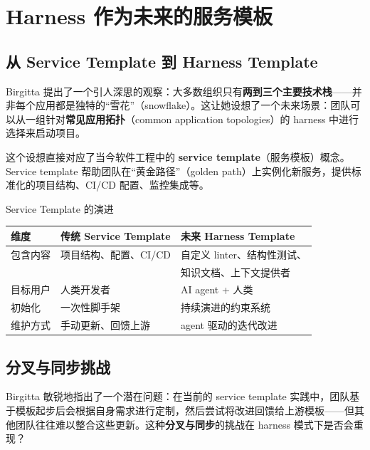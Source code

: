 \documentclass[a4paper]{article}
\begin{document}
\newpage

\section{Harness 作为未来的服务模板}

\subsection{从 Service Template 到 Harness Template}

Birgitta 提出了一个引人深思的观察：大多数组织只有\textbf{两到三个主要技术栈}------并非每个应用都是独特的``雪花''（snowflake）。这让她设想了一个未来场景：团队可以从一组针对\textbf{常见应用拓扑}（common application topologies）的 harness 中进行选择来启动项目。

这个设想直接对应了当今软件工程中的 \textbf{service template}（服务模板）概念。Service template 帮助团队在``黄金路径''（golden path）上实例化新服务，提供标准化的项目结构、CI/CD 配置、监控集成等。

\begin{knowledgebox}{Service Template 的演进}
\begin{table}[H]
\centering
\begin{tabular}{lll}
\toprule
\textbf{维度} & \textbf{传统 Service Template} & \textbf{未来 Harness Template} \\
\midrule
包含内容 & 项目结构、配置、CI/CD & 自定义 linter、结构性测试、 \\
 & & 知识文档、上下文提供者 \\
目标用户 & 人类开发者 & AI agent + 人类 \\
初始化 & 一次性脚手架 & 持续演进的约束系统 \\
维护方式 & 手动更新、回馈上游 & agent 驱动的迭代改进 \\
\bottomrule
\end{tabular}
\end{table}
\end{knowledgebox}

\subsection{分叉与同步挑战}

Birgitta 敏锐地指出了一个潜在问题：在当前的 service template 实践中，团队基于模板起步后会根据自身需求进行定制，然后尝试将改进回馈给上游模板------但其他团队往往难以整合这些更新。这种\textbf{分叉与同步}的挑战在 harness 模式下是否会重现？
\end{document}

